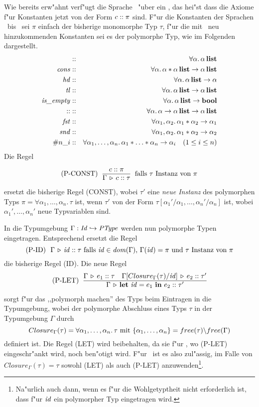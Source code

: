 Wie bereits erw"ahnt verf"ugt die Sprache \LTHREE\ "uber ein , das hei"st dass die Axiome f"ur
Konstanten jetzt von der Form $c\mathrel{::}\pi$ sind. F"ur die Konstanten der Sprachen \LONE\ bis \LTWO\ sei $\pi$
einfach der bisherige monomorphe Typ $\tau$, f"ur die mit \LTHREE\ neu hinzukommenden Konstanten sei es der
polymorphe Typ, wie im Folgenden dargestellt.
\begin{eqnarray*}
 [\,]         & :: & \forall\alpha.\,\listtype{\alpha} \\
\Cons         & :: & \forall\alpha.\,\alpha * \listtype{\alpha}\to \listtype{\alpha}\\
  \Hd         & :: & \forall\alpha.\,\listtype{\alpha} \to \alpha \\
  \Tl         & :: & \forall\alpha.\,\listtype{\alpha} \to \listtype{\alpha}\\
\Empty        & :: & \forall\alpha.\,\listtype{\alpha} \to \bool\\
 \coloncolon  & :: & \forall\alpha.\,\alpha \to \listtype{\alpha} \to \listtype{\alpha}\\
 \Fst         & :: & \forall\alpha_1,\alpha_2.\,\alpha_1 * \alpha_2 \to \alpha_1\\
 \Snd         & :: & \forall\alpha_1,\alpha_2.\,\alpha_1 * \alpha_2 \to \alpha_2\\
 \#n\_i       & :: & \forall\alpha_1,\ldots,\alpha_n.\,\alpha_1 * \ldots * \alpha_n \to \alpha_i \quad (1 \le i \le n)
\end{eqnarray*}
Die Regel
\[ \mbox{(P-CONST) }\ \regel{\tj{c}{\pi}}
                            {\Tj{\Gamma}{c}{\tau}}
   \ \mbox{ falls $\tau$ Instanz von $\pi$}\]
ersetzt die bisherige Regel (CONST), wobei $\tau'$ eine \emph{neue Instanz} des polymorphen Typs
$\pi = \forall\alpha_1,\ldots,\alpha_n.\,\tau$ ist, wenn $\tau'$ von der Form $\tau[\alpha_1'/\alpha_1,\ldots,\alpha_n'/\alpha_n]$
ist, wobei $\alpha_1',\ldots,\alpha_n'$ neue Typvariablen sind.

In die Typumgebung $\Gamma: {\text{\it Id\/}} \hookrightarrow {\text{\it PType\/}}$ werden nun polymorphe Typen eingetragen. Entsprechend ersetzt die Regel
\[ \mbox{(P-ID) }\ \Tj{\Gamma}{\id}{\tau} \reason{falls $\id \in \dom \Gamma$, $\Gamma(\id) = \pi$ und $\tau$ Instanz von $\pi$} \]
die bisherige Regel (ID). Die neue Regel
\[ \mbox{(P-LET) }\ \regel{\Tj{\Gamma}{e_1}{\tau}
                          \quad
                          \Tj{\Gamma[Closure_\Gamma(\tau)/\id]}{e_2}{\tau'}}
                          {\Tj{\Gamma}{\bli{\id}{e_1}{e_2}}{\tau'}}\]
sorgt f"ur das ,,polymorph machen'' des Typs beim Eintragen in die Typumgebung, wobei der polymorphe Abschluss eines Typs $\tau$
in der Typumgebung $\Gamma$ durch
\[
  Closure_\Gamma(\tau) = \forall\alpha_1,\ldots,\alpha_n.\,\tau \ \mbox{mit $\{\alpha_1,\ldots,\alpha_n\} = free(\tau) \backslash free(\Gamma)$}
\]
definiert ist. Die Regel (LET) wird beibehalten, da sie f"ur \LFOUR, wo (P-LET) eingeschr"ankt wird, noch ben"otigt wird. F"ur \LTHREE\ ist
es also zul"assig, im Falle von $Closure_\Gamma(\tau) = \tau$ sowohl (LET) als auch (P-LET) anzuwenden\footnote{Na"urlich auch dann, wenn
es f"ur die Wohlgetyptheit nicht erforderlich ist, dass f"ur ${\text{\it id\/}}$ ein polymorpher Typ eingetragen wird.}.

